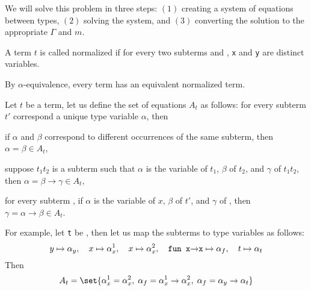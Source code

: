\edefn

We will solve this problem in three steps: $(1)$ creating a system of equations between types, $(2)$ solving the system, and $(3)$ converting the solution to the appropriate $\Gamma$ and $m$.

\bdefn

    A term $t$ is called {\emphcolor normalized} if for every two subterms  and , {\tt x} and {\tt y} are distinct variables.

\edefn

By $\alpha$-equivalence, every term has an equivalent normalized term.

\bdefn

    Let $t$ be a term, let us define the set of equations $A_t$ as follows: for every subterm $t'$ correspond a unique type variable $\alpha$, then
    \benum
        \item if $\alpha$ and $\beta$ correspond to different occurrences of the same subterm, then $\alpha=\beta\in A_t$,
        \item suppose $t_1t_2$ is a subterm such that $\alpha$ is the variable of $t_1$, $\beta$ of $t_2$, and $\gamma$ of $t_1t_2$, then $\alpha=\beta\to\gamma\in A_t$,
        \item for every subterm , if $\alpha$ is the variable of $x$, $\beta$ of $t'$, and $\gamma$ of , then $\gamma=\alpha\to\beta\in A_t$.
    \eenum

\edefn

For example, let {\tt t} be , then let us map the subterms to type variables as follows:
$$ y\mapsto\alpha_y,\quad x\mapsto\alpha_x^1,\quad x\mapsto\alpha_x^2,\quad \lcalc{fun x\to x}\mapsto\alpha_f,\quad t\mapsto\alpha_t $$
Then
$$ A_t = \set{\alpha_x^1=\alpha_x^2,\;\alpha_f=\alpha^1_x\to\alpha^2_x,\;\alpha_f=\alpha_y\to\alpha_t} $$

